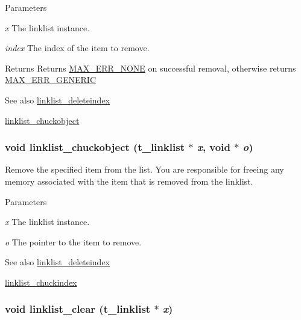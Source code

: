 \begin{DoxyParams}{Parameters}
\item[{\em x}]The linklist instance. \item[{\em index}]The index of the item to remove. \end{DoxyParams}
\begin{DoxyReturn}{Returns}
Returns \hyperlink{group__misc_gga0764dd6c02b76cca7d053ae50555d69da6d22f77fef8b1e1b074cef5d29d935fd}{MAX\_\-ERR\_\-NONE} on successful removal, otherwise returns \hyperlink{group__misc_gga0764dd6c02b76cca7d053ae50555d69dae285bdd436f17560cfd09c6b31ea397d}{MAX\_\-ERR\_\-GENERIC}
\end{DoxyReturn}
\begin{DoxySeeAlso}{See also}
\hyperlink{group__linklist_ga8a93071a90ca14ed02a32fa09f9e13f9}{linklist\_\-deleteindex} 

\hyperlink{group__linklist_ga6621c47c664c57d794ea2540b62d0956}{linklist\_\-chuckobject} 
\end{DoxySeeAlso}
\hypertarget{group__linklist_ga6621c47c664c57d794ea2540b62d0956}{
\subsubsection[{linklist\_\-chuckobject}]{\setlength{\rightskip}{0pt plus 5cm}void linklist\_\-chuckobject ({\bf t\_\-linklist} $\ast$ {\em x}, \/  void $\ast$ {\em o})}}
\label{group__linklist_ga6621c47c664c57d794ea2540b62d0956}


Remove the specified item from the list. You are responsible for freeing any memory associated with the item that is removed from the linklist.


\begin{DoxyParams}{Parameters}
\item[{\em x}]The linklist instance. \item[{\em o}]The pointer to the item to remove.\end{DoxyParams}
\begin{DoxySeeAlso}{See also}
\hyperlink{group__linklist_ga8a93071a90ca14ed02a32fa09f9e13f9}{linklist\_\-deleteindex} 

\hyperlink{group__linklist_gaa89cf5b917b41ad0c15963dd79800b50}{linklist\_\-chuckindex} 
\end{DoxySeeAlso}
\hypertarget{group__linklist_ga551da85a8531e5785a4b748d8a86301a}{
\subsubsection[{linklist\_\-clear}]{\setlength{\rightskip}{0pt plus 5cm}void linklist\_\-clear ({\bf t\_\-linklist} $\ast$ {\em x})}}
\label{group__linklist_ga551da85a8531e5785a4b748d8a86301a}


